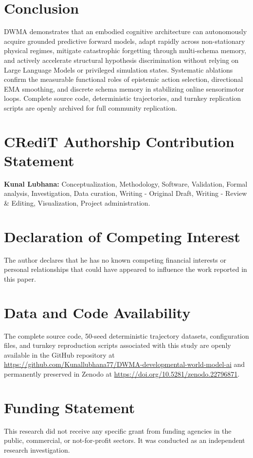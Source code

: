 \documentclass[preprint,12pt]{elsarticle}
\begin{document}
\section{Conclusion}
\label{sec:conclusion}
DWMA demonstrates that an embodied cognitive architecture can autonomously acquire grounded predictive forward models, adapt rapidly across non-stationary physical regimes, mitigate catastrophic forgetting through multi-schema memory, and actively accelerate structural hypothesis discrimination without relying on Large Language Models or privileged simulation states. Systematic ablations confirm the measurable functional roles of epistemic action selection, directional EMA smoothing, and discrete schema memory in stabilizing online sensorimotor loops. Complete source code, deterministic trajectories, and turnkey replication scripts are openly archived for full community replication.

\section*{CRediT Authorship Contribution Statement}
\textbf{Kunal Lubhana:} Conceptualization, Methodology, Software, Validation, Formal analysis, Investigation, Data curation, Writing - Original Draft, Writing - Review \& Editing, Visualization, Project administration.

\section*{Declaration of Competing Interest}
The author declares that he has no known competing financial interests or personal relationships that could have appeared to influence the work reported in this paper.

\section*{Data and Code Availability}
The complete source code, 50-seed deterministic trajectory datasets, configuration files, and turnkey reproduction scripts associated with this study are openly available in the GitHub repository at \url{https://github.com/Kunallubhana77/DWMA-developmental-world-model-ai} and permanently preserved in Zenodo at \url{https://doi.org/10.5281/zenodo.22796871}.

\section*{Funding Statement}
This research did not receive any specific grant from funding agencies in the public, commercial, or not-for-profit sectors. It was conducted as an independent research investigation.
\end{document}
